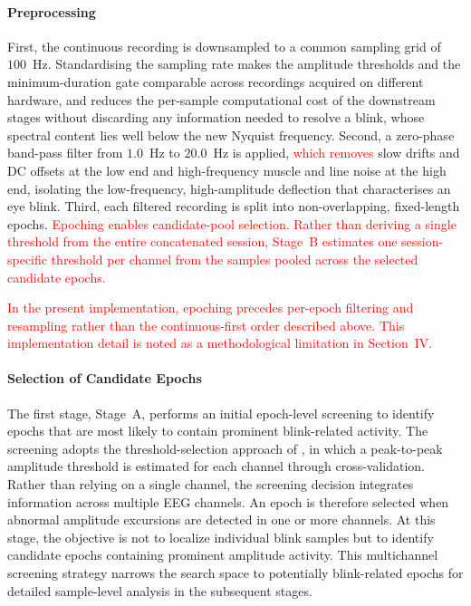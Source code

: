 \documentclass[journal,twoside,web]{ieeecolor}
\newcommand{\rev}[1]{\textcolor{red}{#1}}
\begin{document}
\paragraph{Preprocessing}
First, the continuous recording is downsampled to a common sampling grid of \(100\)~Hz. Standardising the sampling rate makes the
amplitude thresholds and the minimum-duration gate comparable across recordings acquired on different hardware, and reduces the per-sample computational cost of the downstream stages without discarding any information needed to resolve a blink, whose
spectral content lies well below the new Nyquist frequency.
%
Second, a zero-phase band-pass filter from \(1.0\)~Hz  to \(20.0\)~Hz
is applied, \rev{which removes} slow drifts and DC offsets at the low end and high-frequency muscle and line noise at the high end, isolating the low-frequency, high-amplitude deflection that characterises an eye blink.
%
Third, each filtered recording is split into non-overlapping, fixed-length epochs.
%
\rev{Epoching enables candidate-pool selection. Rather than deriving a single threshold from the entire concatenated session, Stage~B estimates one session-specific threshold per channel from the samples pooled across the selected candidate epochs.}

\rev{In the present implementation, epoching precedes per-epoch filtering and resampling rather than the continuous-first order described above. This implementation detail is noted as a methodological limitation in Section~IV.}

 

%
\paragraph{Selection of Candidate Epochs}

The first stage, Stage~A, performs an initial epoch-level screening to identify epochs that are most likely to contain prominent blink-related activity. The screening adopts the threshold-selection approach of \citep{jas2017autoreject}, in which a peak-to-peak amplitude threshold is estimated for each channel through cross-validation. Rather than relying on a single channel, the screening decision integrates information across multiple EEG channels. An epoch is therefore selected when abnormal amplitude excursions are detected in one or more channels. At this stage, the objective is not to localize individual blink samples but to identify candidate epochs containing prominent amplitude activity. This multichannel screening strategy narrows the search space to potentially blink-related epochs for detailed sample-level analysis in the subsequent stages.
\end{document}
